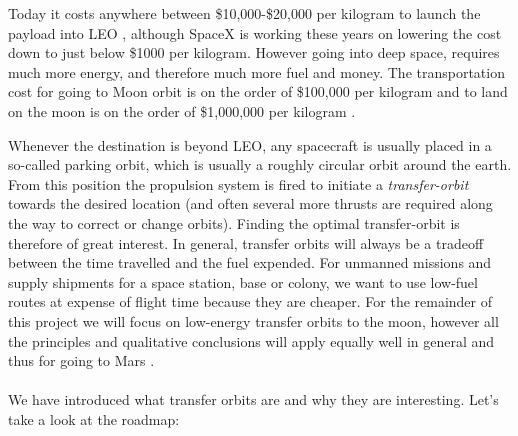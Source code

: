 Today it costs anywhere between \$10,000-\$20,000 per kilogram to launch the payload into LEO \cite{leo-cost}, although SpaceX is working these years on lowering the cost down to just below \$1000 per kilogram. However going into deep space, requires much more energy, and therefore much more fuel and money. The transportation cost for going to Moon orbit is on the order of \$100,000 per kilogram and to land on the moon is on the order of \$1,000,000 per kilogram \cite{astrobotic}\cite{Okada2015}.

Whenever the destination is beyond LEO, any spacecraft is usually placed in a so-called parking orbit, which is usually a roughly circular orbit around the earth. From this position the propulsion system is fired to initiate a \emph{transfer-orbit} towards the desired location (and often several more thrusts are required along the way to correct or change orbits). Finding the optimal transfer-orbit is therefore of great interest. In general, transfer orbits will always be a tradeoff between the time travelled and the fuel expended. For unmanned missions and supply shipments for a space station, base or colony, we want to use low-fuel routes at expense of flight time because they are cheaper. For the remainder of this project we will focus on low-energy transfer orbits to the moon, however all the principles and qualitative conclusions will apply equally well in general and thus for going to Mars \cite{Topputo2014}.\\
\\
We have introduced what transfer orbits are and why they are interesting. Let's take a look at the roadmap:
